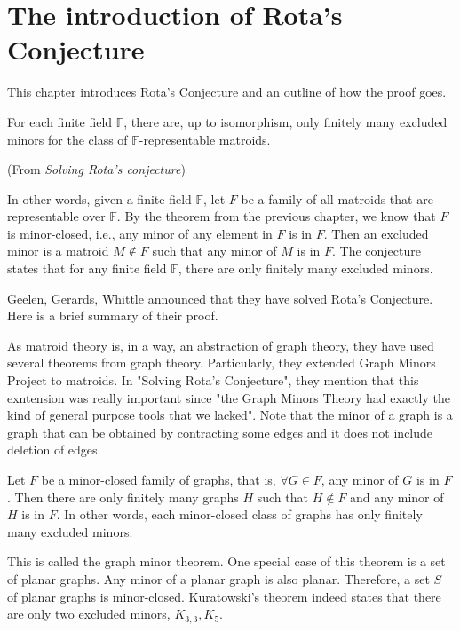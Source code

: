 \section{The introduction of Rota's Conjecture}
This chapter introduces Rota's Conjecture and an outline of how the proof goes.

\begin{conj}
For each finite field $\mathbb{F}$, there are, up to isomorphism, only finitely many excluded minors for the class of $\mathbb{F}$-representable matroids.
\end{conj}(From \textit{Solving Rota's conjecture})

In other words, given a finite field $\mathbb{F}$, let $F$ be a family of all matroids that are representable over $\mathbb{F}$.
By the theorem from the previous chapter, we know that $F$ is minor-closed, i.e., any minor of any element in $F$ is in $F$.
Then an excluded minor is a matroid $M \notin F$ such that any minor of $M$ is in $F$.
The conjecture states that for any finite field $\mathbb{F}$, there are only finitely many excluded minors.

Geelen, Gerards, Whittle announced that they have solved Rota's Conjecture.
Here is a brief summary of their proof.

As matroid theory is, in a way, an abstraction of graph theory, they have used several theorems from graph theory.
Particularly, they extended Graph Minors Project to matroids.
In "Solving Rota's Conjecture", they mention that this exntension was really important since "the Graph Minors Theory had exactly the kind of general purpose tools that we lacked".
Note that the minor of a graph is a graph that can be obtained by contracting some edges and it does not include deletion of edges.

\begin{thm}
Let $F$ be a minor-closed family of graphs, that is, $\forall G \in F$, any minor of $G$ is in $F$.
Then there are only finitely many graphs $H$ such that $H \notin F$ and any minor of $H$ is in $F$.
In other words, each minor-closed class of graphs has only finitely many excluded minors.
\end{thm}

This is called the graph minor theorem.
One special case of this theorem is a set of planar graphs.
Any minor of a planar graph is also planar.
Therefore, a set $S$ of planar graphs is minor-closed.
Kuratowski's theorem indeed states that there are only two excluded minors, $K_{3, 3}, K_5$.

